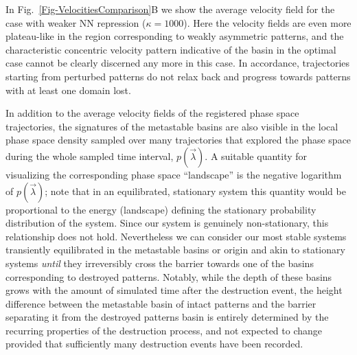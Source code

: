 \documentclass[a4paper,10pt]{article}
\newcommand{\vecA}[1]{\vec{#1}}
\begin{document}
In Fig.~\ref{Fig-VelocitiesComparison}B  we show the average velocity field for the case with weaker NN repression ($\kappa=1000$). Here the velocity fields are even more plateau-like in the region corresponding to weakly asymmetric patterns, and the characteristic concentric velocity pattern indicative of the basin in the optimal case cannot be clearly discerned any more in this case. In accordance, trajectories starting from perturbed patterns do not relax back and progress towards patterns with at least one domain lost.

In addition to the average velocity fields of the registered phase space trajectories, the signatures of the metastable basins are also visible in the local phase space density sampled over many trajectories that explored the phase space during the whole sampled time interval, $p(\vecA\lambda)$. A suitable quantity for visualizing the corresponding phase space ``landscape'' is the negative logarithm of $p(\vecA\lambda)$; note that in an equilibrated, stationary system this quantity would be proportional to the energy (landscape) defining the stationary probability distribution of the system. Since our system is genuinely non-stationary, this relationship does not hold. Nevertheless we can consider our most stable systems transiently equilibrated in the metastable basins or origin and akin to stationary systems \emph{until} they irreversibly cross the barrier towards one of the basins corresponding to destroyed patterns. Notably, while the depth of these basins grows with the amount of simulated time after the destruction event, the height difference between the metastable basin of intact patterns and the barrier separating it from the destroyed patterns basin is entirely determined by the recurring properties of the destruction process, and not expected to change provided that sufficiently many destruction events have been recorded.
\end{document}

